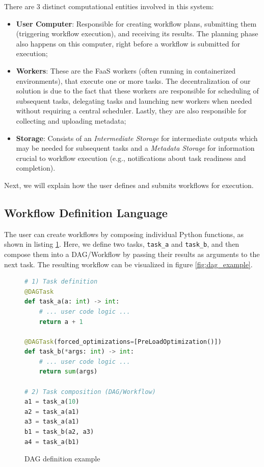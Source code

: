 \documentclass[conference]{IEEEtran}
\begin{document}
There are 3 distinct computational entities involved in this system:

\begin{itemize}
    \item \textbf{User Computer}: Responsible for creating workflow plans, submitting them (triggering workflow execution), and receiving its results. The planning phase also happens on this computer, right before a workflow is submitted for execution;
    \item \textbf{Workers}: These are the FaaS workers (often running in containerized environments), that execute one or more tasks. The decentralization of our solution is due to the fact that these workers are responsible for scheduling of subsequent tasks, delegating tasks and launching new workers when needed without requiring a central scheduler. Lastly, they are also responsible for collecting and uploading metadata;
    \item \textbf{Storage}: Consists of an \textit{Intermediate Storage} for intermediate outputs which may be needed for subsequent tasks and a \textit{Metadata Storage} for information crucial to workflow execution (e.g., notifications about task readiness and completion).
\end{itemize}

Next, we will explain how the user defines and submits workflows for execution.

\subsection{Workflow Definition Language}

The user can create workflows by composing individual Python functions, as shown in listing \ref{lst:dag_lang_example}. Here, we define two tasks, \texttt{task\_a} and \texttt{task\_b}, and then compose them into a DAG/Workflow by passing their results as arguments to the next task. The resulting workflow can be visualized in figure \ref{fig:dag_example}.

\begin{figure}[h]
\centering
\begin{lstlisting}[language=Python, basicstyle=\ttfamily\footnotesize, columns=fullflexible, breaklines=true]
# 1) Task definition
@DAGTask
def task_a(a: int) -> int:
    # ... user code logic ...
    return a + 1

@DAGTask(forced_optimizations=[PreLoadOptimization()])
def task_b(*args: int) -> int:
    # ... user code logic ...
    return sum(args)

# 2) Task composition (DAG/Workflow)
a1 = task_a(10)
a2 = task_a(a1)
a3 = task_a(a1)
b1 = task_b(a2, a3)
a4 = task_a(b1)
\end{lstlisting}
\caption{DAG definition example}
\label{lst:dag_lang_example}
\end{figure}
\end{document}
